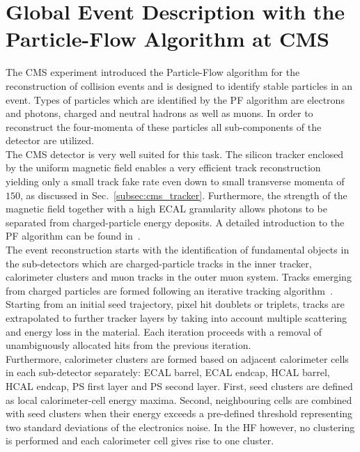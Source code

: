\section{Global Event Description with the Particle-Flow Algorithm at CMS}
\label{sec:pf_algo}
The CMS experiment introduced the Particle-Flow algorithm for the reconstruction of collision events and is designed to identify stable particles in an event. Types of particles which are identified by the PF algorithm are electrons and photons, charged and neutral hadrons as well as muons. In order to reconstruct the four-momenta of these particles all sub-components of the detector are utilized. \\
The CMS detector is very well suited for this task. The silicon tracker enclosed by the uniform magnetic field enables a very efficient track reconstruction yielding only a small track fake rate even down to small transverse momenta of $150$\mev, as discussed in Sec.~\ref{subsec:cms_tracker}. Furthermore, the strength of the magnetic field together with a high ECAL granularity allows photons to be separated from charged-particle energy deposits. A detailed introduction to the PF algorithm can be found in~\cite{CMS-PAS-PFT-09-001}. \\ 
The event reconstruction starts with the identification of fundamental objects in the sub-detectors which are charged-particle tracks in the inner tracker, calorimeter clusters and muon tracks in the outer muon system. Tracks emerging from charged particles are formed following an iterative tracking algorithm~\cite{Adam:934067}. Starting from an initial seed trajectory, \eg pixel hit doublets or triplets, tracks are extrapolated to further tracker layers by taking into account multiple scattering and energy loss in the material. Each iteration proceeds with a removal of unambiguously allocated hits from the previous iteration. \\
Furthermore, calorimeter clusters are formed based on adjacent calorimeter cells in each sub-detector separately: ECAL barrel, ECAL endcap, HCAL barrel, HCAL endcap, PS first layer and PS second layer. First, seed clusters are defined as local calorimeter-cell energy maxima. Second, neighbouring cells are combined with seed clusters when their energy exceeds a pre-defined threshold representing two standard deviations of the electronics noise. In the HF however, no clustering is performed and each calorimeter cell gives rise to one cluster. \\
